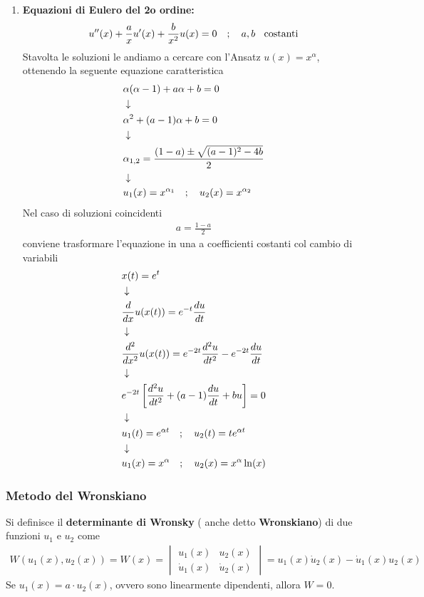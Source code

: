 \begin{enumerate}
	\item \textbf{Equazioni di Eulero del 2o ordine:}
	\begin{align}
		u''(x) + \frac{a}{x}u'(x) + \frac{b}{x^2}u(x) = 0 \quad ; \quad a,b \;\;\ \text{costanti}
	\end{align}
	Stavolta le soluzioni le andiamo a cercare con l'Ansatz $u(x) = x^\alpha$, ottenendo la seguente equazione caratteristica
	\begin{align}
		&\alpha (\alpha - 1) + a\alpha + b = 0 \\ &\downarrow \nonumber \\
		&\alpha^2 + (a-1)\alpha + b = 0 \nonumber \\ &\downarrow \nonumber \\
		&\alpha_{1,2} = \frac{(1-a) \pm \sqrt{(a-1)^2 - 4b}}{2} \\ &\downarrow \nonumber \\
		&u_1 (x) = x^{\alpha_1} \quad ; \quad u_2 (x) = x^{\alpha_2}
	\end{align}
	Nel caso di soluzioni coincidenti
	\begin{align}
		a = \frac{1-a}{2}
	\end{align}
	conviene trasformare l'equazione in una a coefficienti costanti col cambio di variabili
	\begin{align}
		&x(t) = e^t\\ &\downarrow \nonumber \\
		&\frac{d}{dx}u(x(t)) =e^{-t} \frac{du}{dt} \nonumber \\ &\downarrow \nonumber \\
		&\frac{d^2}{dx^2}u(x(t)) =e^{-2t} \frac{d^2u}{dt^2} - e^{-2t} \frac{du}{dt} \nonumber \\ &\downarrow \nonumber \\
		&e^{-2t} \left[ \frac{d^2u}{dt^2} + (a-1)\frac{du}{dt} + bu \right] = 0 \nonumber \\ &\downarrow \nonumber \\
		&u_1(t) = e^{\alpha t} \quad ; \quad u_2(t) = te^{\alpha t} \nonumber \\ &\downarrow \nonumber \\
		&u_1(x) = x^\alpha \quad ; \quad u_2(x) = x^\alpha \ln(x)
	\end{align}
\end{enumerate}

\newpage

\subsubsection{Metodo del Wronskiano}

Si definisce il \textbf{determinante di Wronsky} ( anche detto \textbf{Wronskiano}) di due funzioni $u_1$ e $u_2$ come
\begin{align}
	W(u_1(x),u_2(x)) = W(x) = \begin{vmatrix}
		u_1(x) & u_2(x) \\
		\dot{u}_1(x) &\dot{u}_2(x)
	\end{vmatrix} = u_1(x) \dot{u}_2(x) - \dot{u}_1(x) u_2(x) 
\end{align}
Se  $u_1(x)= a\cdot u_2(x)$, ovvero sono linearmente dipendenti, allora $W=0$.

